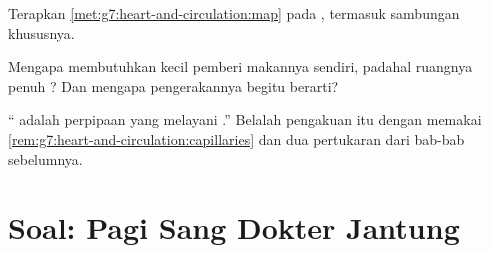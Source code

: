 \begin{exercise}[$\star\star$]\label{exo:g7:heart-and-circulation:10}
Terapkan \cref{met:g7:heart-and-circulation:map} pada ,
termasuk sambungan khususnya.
\end{exercise}

\begin{exercise}[$\star\star$]\label{exo:g7:heart-and-circulation:11}
Mengapa  membutuhkan  kecil pemberi makannya sendiri,
padahal ruangnya penuh ? Dan mengapa pengerakannya begitu
berarti?
\end{exercise}

\begin{exercise}[$\star\star\star$]\label{exo:g7:heart-and-circulation:12}
`` adalah perpipaan yang melayani .'' Belalah pengakuan
itu dengan memakai
\cref{rem:g7:heart-and-circulation:capillaries} dan dua pertukaran
dari bab-bab sebelumnya.
\end{exercise}

\section{Soal: Pagi Sang Dokter Jantung}

